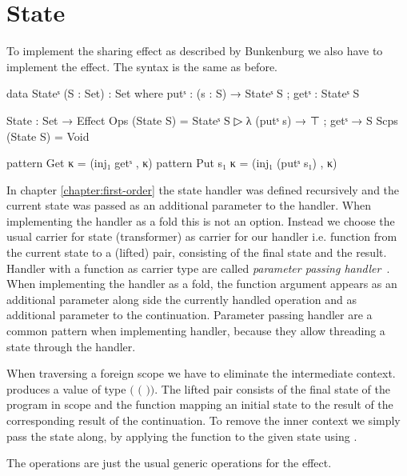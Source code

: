 \section{State}
\label{scoped-algebra:state}

To implement the sharing effect as described by Bunkenburg we also have to
implement the  effect.
The syntax is the same as before.

\begin{code}
data Stateˢ (S : Set) : Set where putˢ : (s : S) → Stateˢ S ; getˢ : Stateˢ S

State : Set → Effect
Ops   (State S) = Stateˢ S ▷ λ{ (putˢ s) → ⊤ ; getˢ → S }
Scps  (State S) = Void

pattern Get κ     = (inj₁ getˢ , κ)
pattern Put s₁ κ  = (inj₁ (putˢ s₁) , κ)
\end{code}
In chapter \ref{chapter:first-order} the state handler was defined recursively
and the current state was passed as an additional parameter to the handler.
When implementing the handler as a fold this is not an option.
Instead we choose the usual carrier for state (transformer) as carrier for our handler i.e.
function from the current state to a (lifted) pair, consisting of the final
state and the result.
Handler with a function as carrier type are called \textit{parameter passing
  handler}~\cite{DBLP:conf/esop/PlotkinP09}.
When implementing the handler as a fold, the function argument appears as an
additional parameter along side the currently handled operation and as
additional parameter to the continuation.
Parameter passing handler are a common pattern when implementing handler,
because they allow threading a state through the handler.

When traversing a foreign scope we have to eliminate the intermediate context.
 produces a value of type
\AgdaSpace{}\AgdaSpace{}$($%
\AgdaSpace{}\AgdaSpace{}$($%
\AgdaSpace{}\AgdaSpace{}%
\AgdaSpace{}\AgdaSpace{}$)$$)$.
The lifted pair consists of the final state of the program in scope and the
function mapping an initial state to the result of the corresponding result of
the continuation.
To remove the inner context we simply pass the state along, by applying the
function to the given state using .

The operations are just the usual generic operations for the effect.

